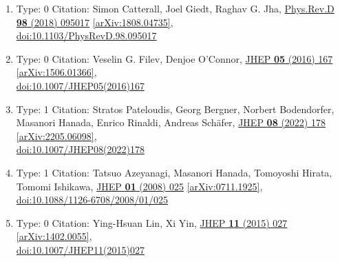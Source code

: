 \documentclass[a4paper,10pt]{article}
\begin{document}
\begin{enumerate}
\begin{enumerate}
  \item Type: 0 Citation: Simon Catterall, Joel Giedt, Raghav G. Jha, \href{https://www.doi.org/10.1103/PhysRevD.98.095017}{Phys.Rev.D {\bf 98} (2018) 095017}  \href{https://arxiv.org/abs/1808.04735}{[arXiv:1808.04735]},\\\href{https://www.doi.org/10.1103/PhysRevD.98.095017}{doi:10.1103/PhysRevD.98.095017}
  \item Type: 0 Citation: Veselin G. Filev, Denjoe O'Connor, \href{https://www.doi.org/10.1007/JHEP05(2016)167}{JHEP {\bf 05} (2016) 167}  \href{https://arxiv.org/abs/1506.01366}{[arXiv:1506.01366]},\\\href{https://www.doi.org/10.1007/JHEP05(2016)167}{doi:10.1007/JHEP05(2016)167}
  \item Type: 1 Citation: Stratos Pateloudis, Georg Bergner, Norbert Bodendorfer, Masanori Hanada, Enrico Rinaldi, Andreas Schäfer, \href{https://www.doi.org/10.1007/JHEP08(2022)178}{JHEP {\bf 08} (2022) 178}  \href{https://arxiv.org/abs/2205.06098}{[arXiv:2205.06098]},\\\href{https://www.doi.org/10.1007/JHEP08(2022)178}{doi:10.1007/JHEP08(2022)178}
  \item Type: 1 Citation: Tatsuo Azeyanagi, Masanori Hanada, Tomoyoshi Hirata, Tomomi Ishikawa, \href{https://www.doi.org/10.1088/1126-6708/2008/01/025}{JHEP {\bf 01} (2008) 025}  \href{https://arxiv.org/abs/0711.1925}{[arXiv:0711.1925]},\\\href{https://www.doi.org/10.1088/1126-6708/2008/01/025}{doi:10.1088/1126-6708/2008/01/025}
  \item Type: 0 Citation: Ying-Hsuan Lin, Xi Yin, \href{https://www.doi.org/10.1007/JHEP11(2015)027}{JHEP {\bf 11} (2015) 027}  \href{https://arxiv.org/abs/1402.0055}{[arXiv:1402.0055]},\\\href{https://www.doi.org/10.1007/JHEP11(2015)027}{doi:10.1007/JHEP11(2015)027}

\end{enumerate}
\end{enumerate}
\end{document}
